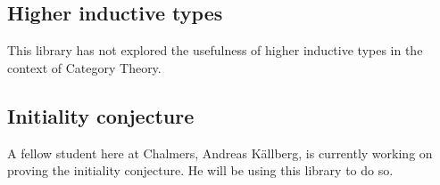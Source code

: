 \subsection{Higher inductive types}
This library has not explored the usefulness of higher inductive types
in the context of Category Theory.

\subsection{Initiality conjecture}
A fellow student here at Chalmers, Andreas Källberg, is currently
working on proving the initiality conjecture. He will
be using this library to do so.
